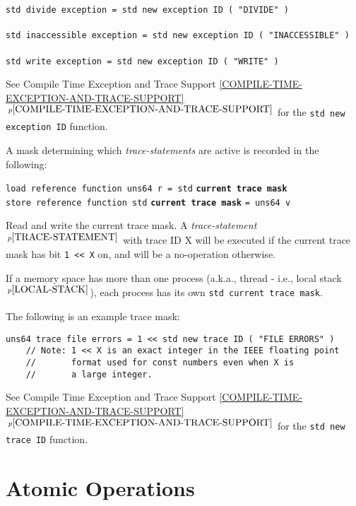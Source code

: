 \documentclass[12pt]{article}
\newcommand{\ttkey}[1]{{\tt \bfseries #1}}
\newcommand{\itemref}[1]{\ref{#1}$\,^{p\pageref{#1}}$}
\newcommand{\pagnote}[1]{$\,^{p\pageref{#1}}$}
\newenvironment{indpar}[1][0.3in]%
	{\begin{list}{}%
		     {\setlength{\itemsep}{0in}%
		      \setlength{\topsep}{0in}%
		      \setlength{\parsep}{1ex}%
		      \setlength{\labelwidth}{#1}%
		      \setlength{\leftmargin}{#1}%
		      \addtolength{\leftmargin}{\labelsep}}%
	 \item}%
	{\end{list}}
\begin{document}
{\tt std divide exception = std new exception ID ( "DIVIDE" )} \\
\hspace*{1in}{\tt // Integer divide by zero.} \\
{\tt std inaccessible exception = std new exception ID ( "INACCESSIBLE" )} \\
\hspace*{1in}{\tt // Read or write of inaccessible memory location.}  \\
{\tt std write exception = std new exception ID ( "WRITE" )} \\
\hspace*{1in}{\tt // Write of accessible but write-protected
                  memory location.}

See Compile Time Exception and Trace Support
\itemref{COMPILE-TIME-EXCEPTION-AND-TRACE-SUPPORT}
for the {\tt std new exception ID} function.

A mask determining which {\em trace-statements} are active
is recorded in the following:

{\tt load reference function uns64 r = std} \ttkey{current trace mask}%
\label{CURRENT-TRACE-MASK} \\
{\tt store reference function std} \ttkey{current trace mask} {\tt = uns64 v}
\begin{indpar}
Read and write the current trace mask.
A {\em trace-statement}\pagnote{TRACE-STATEMENT} with trace ID X
will be executed if the current trace mask has bit {\tt 1 <{}< X}
on, and will be a no-operation otherwise.
\end{indpar}

If a memory space has more than one process (a.k.a., thread - i.e., local
stack\pagnote{LOCAL-STACK}), each process has its own
{\tt std current trace mask}.

The following is an example trace mask:
\begin{indpar}\begin{verbatim}
uns64 trace file errors = 1 << std new trace ID ( "FILE ERRORS" )
    // Note: 1 << X is an exact integer in the IEEE floating point
    //       format used for const numbers even when X is
    //       a large integer.
\end{verbatim}\end{indpar}

See Compile Time Exception and Trace Support
\itemref{COMPILE-TIME-EXCEPTION-AND-TRACE-SUPPORT}
for the {\tt std new trace ID} function.


\section{Atomic Operations}
\label{ATOMIC-OPERATIONS}
\end{document}
